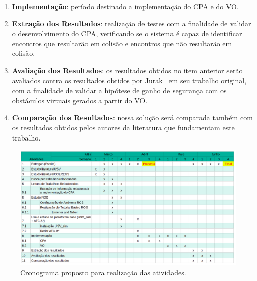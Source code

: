 \begin{enumerate}
            \item \textbf{Implementação}: período destinado a implementação do CPA e do VO.
            
            \item \textbf{Extração dos Resultados}: realização de testes com a finalidade de validar o desenvolvimento do CPA, verificando se o sistema é capaz de identificar encontros que resultarão em colisão e encontros que não resultarão em colisão.
            
            \item \textbf{Avaliação dos Resultados}: os resultados obtidos no item anterior serão avaliados contra os resultados obtidos por Jurak~\cite{JURAK2020} em seu trabalho original, com a finalidade de validar a hipótese de ganho de segurança com os obstáculos virtuais gerados a partir do VO.
            
            \item \textbf{Comparação dos Resultados}: nossa solução será comparada também com os resultados obtidos pelos autores da literatura que fundamentam este trabalho.
        \end{enumerate}
        
        \begin{figure}[htb]
            \centering\includegraphics[width=1.3\textwidth, angle=90]{fig/chap3/schedule.png}
            \caption{\label{fig:chap3_schedule} Cronograma proposto para realização das atividades.}
        \end{figure}